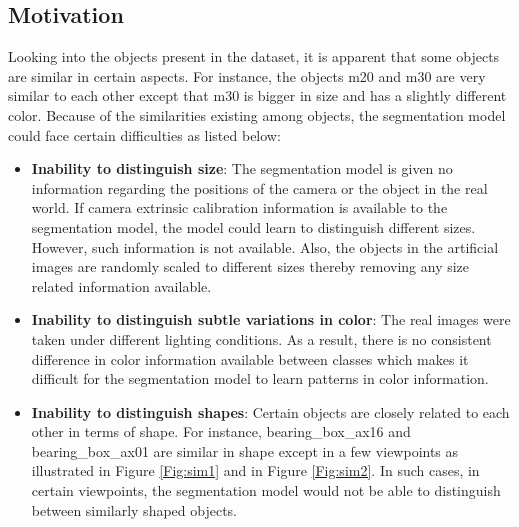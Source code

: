 	\subsection{Motivation}
		Looking into the objects present in the dataset, it is apparent that some objects are similar in certain aspects. For instance, the objects m20 and m30 are very similar to each other except that m30 is bigger in size and has a slightly different color. Because of the similarities existing among objects, the segmentation model could face certain difficulties as listed below:
		\begin{itemize}
			\item \textbf{Inability to distinguish size}: The segmentation model is given no information regarding the positions of the camera or the object in the real world. If camera extrinsic calibration information is available to the segmentation model, the model could learn to distinguish different sizes. However, such information is not available. Also, the objects in the artificial images are randomly scaled to different sizes thereby removing any size related information available.
			\item \textbf{Inability to distinguish subtle variations in color}: The real images were taken under different lighting conditions. As a result, there is no consistent difference in color information available between classes which makes it difficult for the segmentation model to learn patterns in color information.
			\item \textbf{Inability to distinguish shapes}: Certain objects are closely related to each other in terms of shape. For instance, bearing\_box\_ax16 and bearing\_box\_ax01 are similar in shape except in a few viewpoints as illustrated in Figure \ref{Fig:sim1} and in Figure \ref{Fig:sim2}. In such cases, in certain viewpoints, the segmentation model would not be able to distinguish between similarly shaped objects.
			

\end{itemize}
